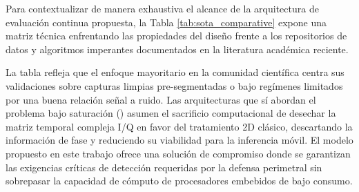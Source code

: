 Para contextualizar de manera exhaustiva el alcance de la arquitectura de evaluación continua propuesta, la Tabla \ref{tab:sota_comparative} expone una matriz técnica enfrentando las propiedades del diseño frente a los repositorios de datos y algoritmos imperantes documentados en la literatura académica reciente.

\begin{table}[H]
\centering
{}
\caption{Matriz comparativa de capacidades y restricciones entre la literatura contemporánea y el sistema propuesto.}
\label{tab:sota_comparative}
\end{table}

La tabla refleja que el enfoque mayoritario en la comunidad científica centra sus validaciones sobre capturas limpias pre-segmentadas o bajo regímenes limitados por una buena relación señal a ruido. Las arquitecturas que sí abordan el problema bajo saturación (\cite{gluge_robust_2024}) asumen el sacrificio computacional de desechar la matriz temporal compleja I/Q en favor del tratamiento 2D clásico, descartando la información de fase y reduciendo su viabilidad para la inferencia móvil. El modelo propuesto en este trabajo ofrece una solución de compromiso donde se garantizan las exigencias críticas de detección requeridas por la defensa perimetral sin sobrepasar la capacidad de cómputo de procesadores embebidos de bajo consumo.